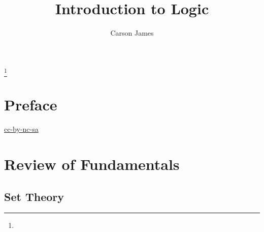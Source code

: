 \documentclass{book}
\begin{document}
	
	\frontmatter
	
	\title{Introduction to Logic}
	
	
	\author{Carson James}
	\thanks{}
	
	\date{}
	
	\maketitle
	
	
	\setcounter{page}{4}
	
	\tableofcontents
	\printunsrtglossary[type=symbols,style=long,title={Notation}]
	
	
	\mainmatter
	
	\chapter*{Preface}
	
	\begin{flushleft}
		\href{https://creativecommons.org/licenses/by-nc-sa/4.0/legalcode.txt}{cc-by-nc-sa}
	\end{flushleft}
	
	\newpage
	
	\chapter{Review of Fundamentals}
	
	\section{Set Theory}
	
\end{document}
